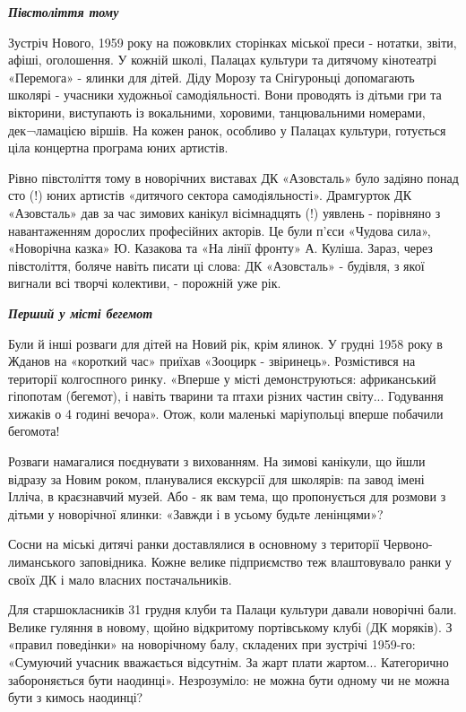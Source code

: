 \textbf{\emph{Півстоліття тому}}

Зустріч Нового, 1959 року на пожовклих сторінках міської преси - нотатки,
звіти, афіші, оголошення. У кожній школі, Палацах культури та дитячому
кінотеатрі «Перемога» - ялинки для дітей. Діду Морозу та Снігуроньці
допомагають школярі - учасники художньої самодіяльності. Вони проводять із
дітьми гри та вікторини, виступають із вокальними, хоровими, танцювальними
номерами, дек¬ламацією віршів. На кожен ранок, особливо у Палацах культури,
готується ціла концертна програма юних артистів.

Рівно півстоліття тому в новорічних виставах ДК «Азовсталь» було задіяно понад
сто (!) юних артистів «дитячого сектора самодіяльності». Драмгурток ДК
«Азовсталь» дав за час зимових канікул вісімнадцять (!) уявлень - порівняно з
навантаженням дорослих професійних акторів. Це були п'єси «Чудова сила»,
«Новорічна казка» Ю. Казакова та «На лінії фронту» А. Куліша. Зараз, через
півстоліття, боляче навіть писати ці слова: ДК «Азовсталь» - будівля, з якої
вигнали всі творчі колективи, - порожній уже рік.

\textbf{\emph{Перший у місті бегемот}}

Були й інші розваги для дітей на Новий рік, крім ялинок. У грудні 1958 року в
Жданов на «короткий час» приїхав «Зооцирк - звіринець». Розмістився на
території колгоспного ринку. «Вперше у місті демонструються: африканський
гіпопотам (бегемот), і навіть тварини та птахи різних частин світу... Годування
хижаків о 4 годині вечора». Отож, коли маленькі маріупольці вперше побачили
бегомота!

Розваги намагалися поєднувати з вихованням. На зимові канікули, що йшли відразу
за Новим роком, планувалися екскурсії для школярів: па завод імені Ілліча, в
краєзнавчий музей. Або - як вам тема, що пропонується для розмови з дітьми у
новорічної ялинки: «Завжди і в усьому будьте ленінцями»?

Сосни на міські дитячі ранки доставлялися в основному з території
Червоно-лиманського заповідника. Кожне велике підприємство теж влаштовувало
ранки у своїх ДК і мало власних постачальників.

Для старшокласників 31 грудня клуби та Палаци культури давали новорічні бали.
Велике гуляння в новому, щойно відкритому портівському клубі (ДК моряків). З
«правил поведінки» на новорічному балу, складених при зустрічі 1959-го:
«Сумуючий учасник вважається відсутнім. За жарт плати жартом... Категорично
забороняється бути наодинці». Незрозуміло: не можна бути одному чи не можна
бути з кимось наодинці?

